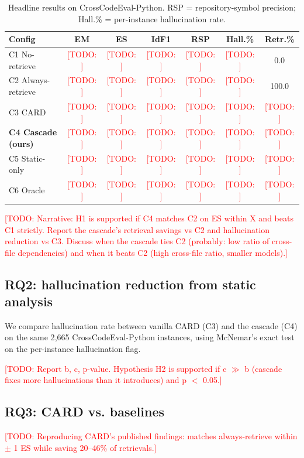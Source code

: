 \documentclass[10pt,twocolumn]{article}
\newcommand{\todo}[1]{\textcolor{red}{[TODO: #1]}}
\begin{document}
\begin{table}[h]
\centering
\small
\begin{tabular}{lcccccc}
\toprule
Config & EM & ES & IdF1 & RSP & Hall.\% & Retr.\% \\
\midrule
C1 No-retrieve     & \todo{} & \todo{} & \todo{} & \todo{} & \todo{} & 0.0 \\
C2 Always-retrieve & \todo{} & \todo{} & \todo{} & \todo{} & \todo{} & 100.0 \\
C3 CARD            & \todo{} & \todo{} & \todo{} & \todo{} & \todo{} & \todo{} \\
\textbf{C4 Cascade (ours)} & \todo{} & \todo{} & \todo{} & \todo{} & \todo{} & \todo{} \\
C5 Static-only     & \todo{} & \todo{} & \todo{} & \todo{} & \todo{} & \todo{} \\
C6 Oracle          & \todo{} & \todo{} & \todo{} & \todo{} & \todo{} & \todo{} \\
\bottomrule
\end{tabular}
\caption{Headline results on CrossCodeEval-Python. RSP =
repository-symbol precision; Hall.\% = per-instance hallucination rate.}
\label{tab:rq1_cce}
\end{table}

\todo{Narrative: H1 is supported if C4 matches C2 on ES within X and
beats C1 strictly. Report the cascade's retrieval savings vs C2 and
hallucination reduction vs C3. Discuss when the cascade ties C2
(probably: low ratio of cross-file dependencies) and when it beats C2
(high cross-file ratio, smaller models).}

\subsection{RQ2: hallucination reduction from static analysis}

We compare hallucination rate between vanilla CARD (C3) and the cascade
(C4) on the same 2{,}665 CrossCodeEval-Python instances, using McNemar's
exact test on the per-instance hallucination flag.

\todo{Report b, c, p-value. Hypothesis H2 is supported if c $\gg$ b
(cascade fixes more hallucinations than it introduces) and p $<$ 0.05.}

\subsection{RQ3: CARD vs. baselines}

\todo{Reproducing CARD's published findings: matches always-retrieve
within $\pm$ 1 ES while saving 20--46\% of retrievals.}
\end{document}
